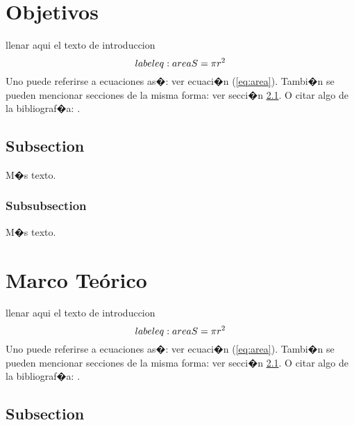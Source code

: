 \documentclass{article}
\theoremstyle{definition}
\theoremstyle{remark}
\begin{document}
\section{Objetivos}

llenar aqui el texto de introduccion
\begin{equation}\\label{eq:area}
  S = \pi r^2
\end{equation}
Uno puede referirse a ecuaciones as�: ver ecuaci�n (\ref{eq:area}).
Tambi�n se pueden mencionar secciones de la misma forma: ver secci�n
\ref{sec:nada}. O citar algo de la bibliograf�a: \cite{Cd94}.

\subsection{Subsection}\label{sec:nada}

M�s texto.

\subsubsection{Subsubsection}\label{sec:nada2}

M�s texto.





\section{Marco Te\'orico}

llenar aqui el texto de introduccion
\begin{equation}\\label{eq:area}
  S = \pi r^2
\end{equation}
Uno puede referirse a ecuaciones as�: ver ecuaci�n (\ref{eq:area}).
Tambi�n se pueden mencionar secciones de la misma forma: ver secci�n
\ref{sec:nada}. O citar algo de la bibliograf�a: \cite{Cd94}.

\subsection{Subsection}\label{sec:nada}
\end{document}
